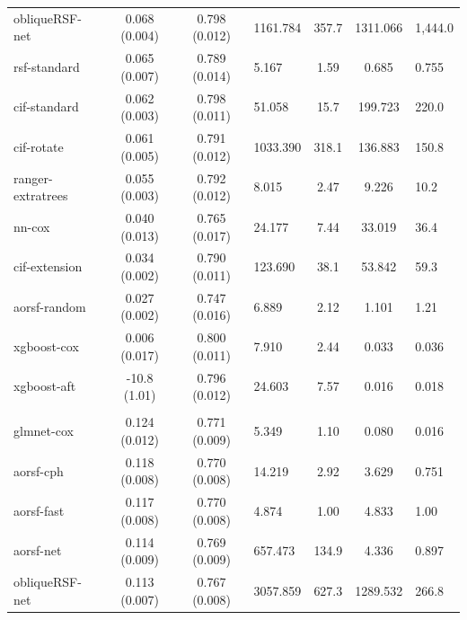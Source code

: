 \documentclass[twoside,11pt]{article}\usepackage[]{graphicx}\usepackage[]{xcolor}
\newenvironment{knitrout}{}{} %
\begin{document}
\begin{knitrout}
\begin{longtable}{lcclccl}
\hspace{1em}obliqueRSF-net & 0.068 (0.004) & 0.798 (0.012) & 1161.784 & 357.7 & 1311.066 & 1,444.0\\
\hspace{1em}rsf-standard & 0.065 (0.007) & 0.789 (0.014) & 5.167 & 1.59 & 0.685 & 0.755\\
\hspace{1em}cif-standard & 0.062 (0.003) & 0.798 (0.011) & 51.058 & 15.7 & 199.723 & 220.0\\
\hspace{1em}cif-rotate & 0.061 (0.005) & 0.791 (0.012) & 1033.390 & 318.1 & 136.883 & 150.8\\
\hspace{1em}ranger-extratrees & 0.055 (0.003) & 0.792 (0.012) & 8.015 & 2.47 & 9.226 & 10.2\\
\hspace{1em}nn-cox & 0.040 (0.013) & 0.765 (0.017) & 24.177 & 7.44 & 33.019 & 36.4\\
\hspace{1em}cif-extension & 0.034 (0.002) & 0.790 (0.011) & 123.690 & 38.1 & 53.842 & 59.3\\
\hspace{1em}aorsf-random & 0.027 (0.002) & 0.747 (0.016) & 6.889 & 2.12 & 1.101 & 1.21\\
\hspace{1em}xgboost-cox & 0.006 (0.017) & 0.800 (0.011) & 7.910 & 2.44 & 0.033 & 0.036\\
\hspace{1em}xgboost-aft & -10.8 (1.01) & 0.796 (0.012) & 24.603 & 7.57 & 0.016 & 0.018\\
\addlinespace[0.3em]
\hline
\multicolumn{7}{l}{\textit{\textbf{SPRINT; death, n = 9361, p = 174}}}\\
\hline
\hspace{1em}glmnet-cox & 0.124 (0.012) & 0.771 (0.009) & 5.349 & 1.10 & 0.080 & 0.016\\
\hspace{1em}aorsf-cph & 0.118 (0.008) & 0.770 (0.008) & 14.219 & 2.92 & 3.629 & 0.751\\
\hspace{1em}aorsf-fast & 0.117 (0.008) & 0.770 (0.008) & 4.874 & 1.00 & 4.833 & 1.00\\
\hspace{1em}aorsf-net & 0.114 (0.009) & 0.769 (0.009) & 657.473 & 134.9 & 4.336 & 0.897\\
\hspace{1em}obliqueRSF-net & 0.113 (0.007) & 0.767 (0.008) & 3057.859 & 627.3 & 1289.532 & 266.8\\

\end{longtable}
\end{knitrout}
\end{document}

